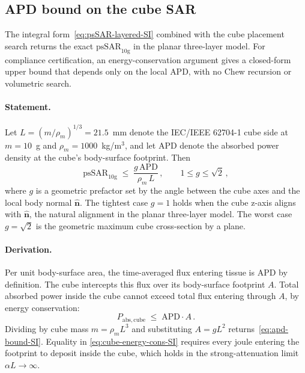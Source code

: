 \documentclass[journal,twocolumn,10pt]{IEEEtran}
\theoremstyle{plain}
\theoremstyle{remark}
\newcommand{\nhat}{\hat{\bm{n}}}
\newcommand{\APD}{\mathrm{APD}}
\begin{document}
\subsection{APD bound on the cube SAR}\label{si:apd-bound}

The integral form~\eqref{eq:psSAR-layered-SI} combined with the cube
placement search returns the exact $\mathrm{psSAR}_{10\mathrm{g}}$ in
the planar three-layer model. For compliance certification, an
energy-conservation argument gives a closed-form upper bound that
depends only on the local \gls{APD}, with no Chew recursion or
volumetric search.

\paragraph{Statement.}
Let $L = (m/\rho_m)^{1/3} = 21.5$~mm denote the IEC/IEEE 62704-1 cube
side at $m = 10$~g and $\rho_m = 1000$~kg/m$^3$, and let $\APD$ denote
the absorbed power density at the cube's body-surface footprint. Then
\begin{equation}\label{eq:apd-bound-SI}
  \mathrm{psSAR}_{10\mathrm{g}} \;\le\; \frac{g\,\APD}{\rho_m\,L}\, ,
  \qquad 1 \le g \le \sqrt{2}\, ,
\end{equation}
where $g$ is a geometric prefactor set by the angle between the cube
axes and the local body normal $\nhat$. The tightest case $g = 1$
holds when the cube z-axis aligns with $\nhat$, the natural alignment
in the planar three-layer model. The worst case $g = \sqrt{2}$ is the
geometric maximum cube cross-section by a plane.

\paragraph{Derivation.}
Per unit body-surface area, the time-averaged flux entering tissue is
$\APD$ by definition. The cube intercepts this flux over its
body-surface footprint $A$. Total absorbed power inside the cube
cannot exceed total flux entering through $A$, by energy conservation:
\begin{equation}\label{eq:cube-energy-cons-SI}
  P_{\mathrm{abs, cube}} \;\le\; \APD \cdot A\, .
\end{equation}
Dividing by cube mass $m = \rho_m L^3$ and substituting $A = g L^2$
returns~\eqref{eq:apd-bound-SI}. Equality in
\eqref{eq:cube-energy-cons-SI} requires every joule entering the
footprint to deposit inside the cube, which holds in the
strong-attenuation limit $\alpha L \to \infty$.
\end{document}
